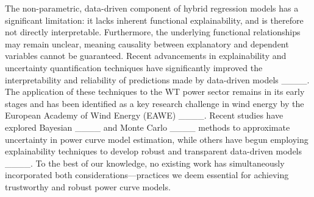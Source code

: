 The non-parametric, data-driven component of hybrid regression models has a significant limitation: it lacks inherent functional explainability, and is therefore not directly interpretable. Furthermore, the underlying functional relationships may remain unclear, meaning causality between explanatory and dependent variables cannot be guaranteed. Recent advancements in explainability and uncertainty quantification techniques have significantly improved the interpretability and reliability of predictions made by data-driven models ____. The application of these techniques to the WT power sector remains in its early stages and has been identified as a key research challenge in wind energy by the European Academy of Wind Energy (EAWE) ____. Recent studies have explored Bayesian ____ and Monte Carlo ____ methods to approximate uncertainty in power curve model estimation, while others have begun employing explainability techniques to develop robust and transparent data-driven models ____. To the best of our knowledge, no existing work has simultaneously incorporated both considerations—practices we deem essential for achieving trustworthy and robust power curve models.

